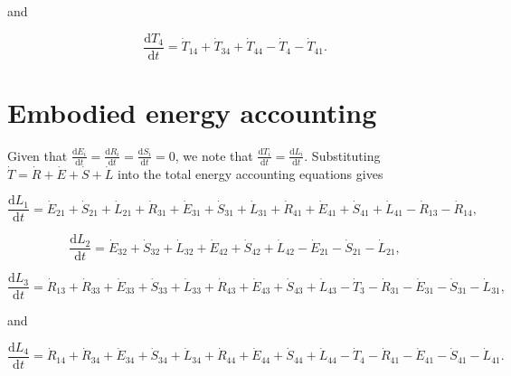 \noindent and 

\begin{equation} \label{eq:D-CV_T_4}
	\frac{\mathrm{d}T_{4}}{\mathrm{d}t} 	 = \dot{T}_{14} + \dot{T}_{34} + \dot{T}_{44} - \dot{T}_{4} - \dot{T}_{41}.
\end{equation}


\section{Embodied energy accounting}

Given that $\frac{\mathrm{d}E_{i}}{\mathrm{d}t} = \frac{\mathrm{d}R_{i}}{\mathrm{d}t} = \frac{\mathrm{d}S_{i}}{\mathrm{d}t} = 0$, we note that $\frac{\mathrm{d}T_i}{\mathrm{d}t} = \frac{\mathrm{d}L_i}{\mathrm{d}t}$. Substituting $\dot{T} = \dot{R} + \dot{E} + \dot{S} + \dot{L}$ into the total energy accounting equations gives

\begin{equation} \label{eq:D-CV_dB_1}
	\frac{\mathrm{d}L_{1}}{\mathrm{d}t} 	 = \dot{E}_{21} + \dot{S}_{21} + \dot{L}_{21} + \dot{R}_{31} + \dot{E}_{31} + \dot{S}_{31} + \dot{L}_{31} + \dot{R}_{41} + \dot{E}_{41} + \dot{S}_{41} + \dot{L}_{41} - \dot{R}_{13} - \dot{R}_{14},
\end{equation}

\begin{equation} \label{eq:D-CV_dB_2}
	\frac{\mathrm{d}L_{2}}{\mathrm{d}t} 	 = \dot{E}_{32} + \dot{S}_{32} + \dot{L}_{32} + \dot{E}_{42} + \dot{S}_{42} + \dot{L}_{42} - \dot{E}_{21} - \dot{S}_{21} - \dot{L}_{21},
\end{equation}

\begin{equation} \label{eq:D-CV_dB_3}
	\frac{\mathrm{d}L_{3}}{\mathrm{d}t} 	 = \dot{R}_{13} + \dot{R}_{33} + \dot{E}_{33} + \dot{S}_{33} + \dot{L}_{33} + \dot{R}_{43} + \dot{E}_{43} + \dot{S}_{43} + \dot{L}_{43} - \dot{T}_{3} - \dot{R}_{31} - \dot{E}_{31} - \dot{S}_{31} - \dot{L}_{31},
\end{equation}

\noindent and 

\begin{equation} \label{eq:D-CV_dB_4}
	\frac{\mathrm{d}L_{4}}{\mathrm{d}t} 	 = \dot{R}_{14} + \dot{R}_{34} + \dot{E}_{34} + \dot{S}_{34} + \dot{L}_{34} + \dot{R}_{44} + \dot{E}_{44} + \dot{S}_{44} + \dot{L}_{44} - \dot{T}_{4} - \dot{R}_{41} - \dot{E}_{41} - \dot{S}_{41} - \dot{L}_{41}.
\end{equation}

